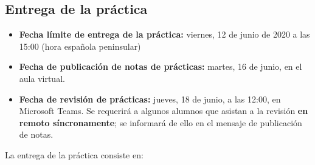 \subsection{Entrega de la práctica}

\begin{itemize}
  \item \textbf{Fecha límite de entrega de la práctica:} viernes, 12 de junio de 2020 a las 15:00 (hora española peninsular)

  \item \textbf{Fecha de publicación de notas de prácticas:} martes, 16 de junio, en el aula virtual.

  \item \textbf{Fecha de revisión de prácticas:} jueves, 18 de junio, a las 12:00, en Microsoft Teams. Se requerirá a algunos alumnos que asistan a la revisión {\bf en remoto síncronamente}; se informará de ello en el mensaje de publicación de notas.
\end{itemize}

La entrega de la práctica consiste en:

